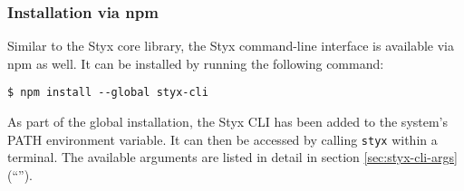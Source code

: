 \subsubsection{Installation via npm}

Similar to the Styx core library, the Styx command-line interface is available via npm as well. It can be installed by running the following command:

\begin{verbatim}
$ npm install --global styx-cli
\end{verbatim}

As part of the global installation, the Styx CLI has been added to the system's PATH environment variable. It can then be accessed by calling \texttt{styx} within a terminal. The available arguments are listed in detail in section \ref{sec:styx-cli-args} (``'').
